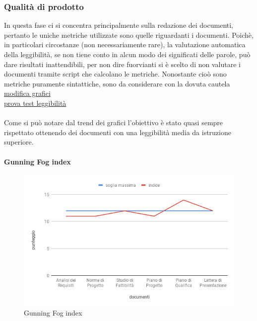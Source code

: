 \subsubsection{Qualità di prodotto}
In questa fase ci si concentra principalmente sulla redazione dei documenti, pertanto le uniche metriche utilizzate sono quelle riguardanti i documenti.
Poichè, in particolari circostanze (non necessariamente rare), la valutazione automatica della leggibilità, se non tiene conto in alcun modo dei significati delle parole, può dare risultati inattendibili, per non dire fuorvianti si è scelto di non valutare i documenti tramite script che calcolano le metriche.
Nonostante cioò sono metriche puramente sintattiche, sono da considerare con la dovuta cautela \\
\href{https://docs.google.com/spreadsheets/d/1yMKJyV4I8FXQ7GUQOq8m1RdZeTYFTJ387ixzofNrfLI/edit?usp=sharing}{modifica grafici}\\
\href{https://www.webfx.com/tools/read-able/check.php?tab=Test+By+Url&uri=https%3A%2F%2Fwww.ispazio.net}{prova test leggibilità}
	 \\ \\
	Come si può notare dal trend dei grafici l'obiettivo è stato quasi sempre rispettato ottenendo dei documenti con una leggibilità media da istruzione superiore.
	\clearpage
\paragraph{Gunning Fog index}
\hspace{15cm}
\begin{figure}[!htbp]
	\centering
	\includegraphics[scale=0.5]{GunningFogIndex.png}
	\caption{Gunning Fog index}

\end{figure}
